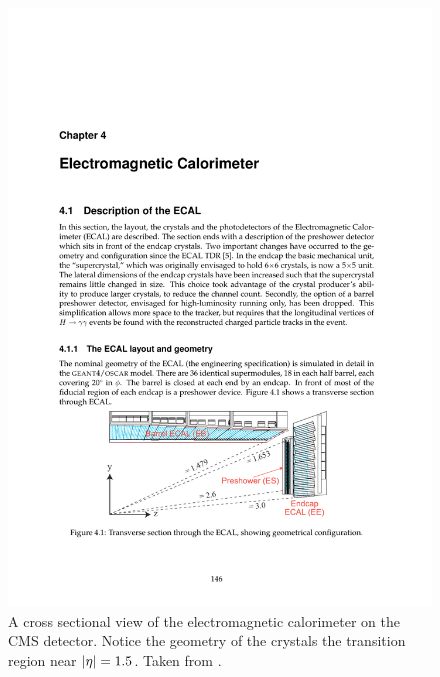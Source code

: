    \begin{figure}[h!]
      \centering
      \includegraphics[width=.9\textwidth]{figures/cms_ecal_xsec.pdf}
      \caption{A cross sectional view of the electromagnetic calorimeter on the CMS detector. Notice the geometry of the crystals the transition region near $\lvert \eta \rvert = 1.5$. Taken from \cite{cms_tdr}.}
      \label{fig:ecal_xsec}
    \end{figure}

